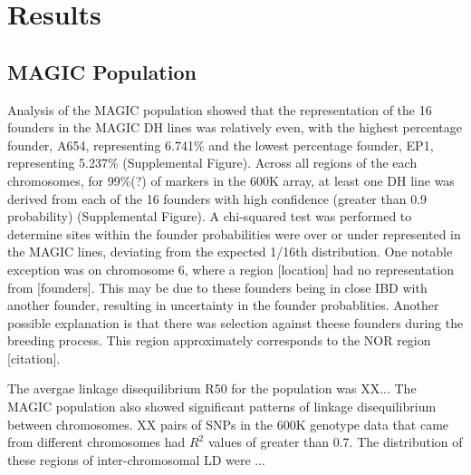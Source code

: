 \documentclass[article,9pt,twocolumn,twoside]{rilabRxiv}
\begin{document}



\section{Results}

\subsection{MAGIC Population}
Analysis of the MAGIC population showed that the representation of the 16 founders in the MAGIC DH lines was relatively even, with the highest percentage founder, A654, representing 6.741\% and the lowest percentage founder, EP1, representing 5.237\% (Supplemental Figure). Across all regions of the each chromosomes, for 99\%(?) of markers in the 600K array, at least one DH line was derived from each of the 16 founders with high confidence (greater than 0.9 probability) (Supplemental Figure).
A chi-squared test was performed to determine sites within the founder probabilities were over or under represented in the MAGIC lines, deviating from the expected 1/16th distribution.
One notable exception was on chromosome 6, where a region [location] had no representation from [founders]. This may be due to these founders being in close IBD with another founder, resulting in uncertainty in the founder probablities. Another possible explanation is that there was selection against theese founders during the breeding process. This region approximately corresponds to the NOR region [citation].

The avergae linkage disequilibrium R50 for the population was XX...
The MAGIC population also showed significant patterns of linkage disequilibrium between
chromosomes. XX pairs of SNPs in the 600K genotype data that came from different chromosomes had $R^2$ values of greater than 0.7. The distribution of these regions of inter-chromosomal LD were ...
\end{document}
